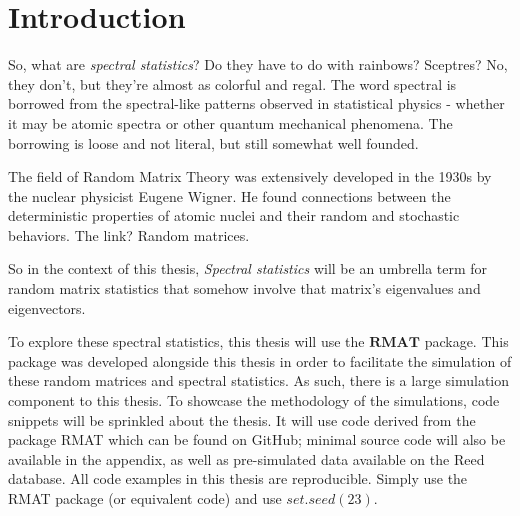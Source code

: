 
  \chapter*{Introduction}


So, what are \textit{spectral statistics}? Do they have to do with rainbows? Sceptres? No, they don’t, but they’re almost as colorful and regal. The word spectral is borrowed from the spectral-like patterns observed in statistical physics - whether it may be atomic spectra or other quantum mechanical phenomena. The borrowing is loose and not literal, but still somewhat well founded.

The field of Random Matrix Theory was extensively developed in the 1930s by the nuclear physicist Eugene Wigner. He found connections between the deterministic properties of atomic nuclei and their random and stochastic behaviors. The link? Random matrices.

So in the context of this thesis, \textit{Spectral statistics} will be an umbrella term for random matrix statistics that somehow involve that matrix's eigenvalues and eigenvectors.

To explore these spectral statistics, this thesis will use the $\textbf{RMAT}$ package. This package was developed alongside this thesis in order to facilitate the simulation of these random matrices and spectral statistics. As such, there is a large simulation component to this thesis. To showcase the methodology of the simulations, code snippets will be sprinkled about the thesis. It will use code derived from the package RMAT which can be found on GitHub; minimal source code will also be available in the appendix, as well as pre-simulated data available on the Reed database. All code examples in this thesis are reproducible. Simply use the RMAT package (or equivalent code) and use $set.seed(23)$.
